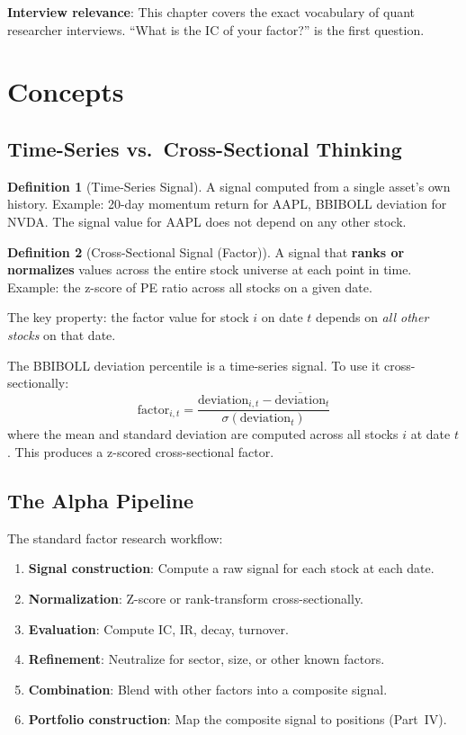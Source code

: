 \documentclass[a4paper, 11pt]{report}
\theoremstyle{definition}
\newtheorem{definition}{Definition}[chapter]
\theoremstyle{remark}
\begin{document}
\textbf{Interview relevance}: This chapter covers the exact vocabulary of quant
researcher interviews.  ``What is the IC of your factor?'' is the first question.

\section{Concepts}

\subsection{Time-Series vs.\ Cross-Sectional Thinking}

\begin{definition}[Time-Series Signal]
    A signal computed from a single asset's own history.  Example: 20-day
    momentum return for AAPL, BBIBOLL deviation for NVDA\@.  The signal value
    for AAPL does not depend on any other stock.
\end{definition}

\begin{definition}[Cross-Sectional Signal (Factor)]
    A signal that \textbf{ranks or normalizes} values across the entire stock
    universe at each point in time.  Example: the z-score of PE ratio across
    all stocks on a given date.

    The key property: the factor value for stock $i$ on date $t$ depends on
    \emph{all other stocks} on that date.
\end{definition}

The BBIBOLL deviation percentile is a time-series signal.  To use it
cross-sectionally:
\[
    \text{factor}_{i,t} = \frac{\text{deviation}_{i,t} - \overline{\text{deviation}}_t}
                               {\sigma(\text{deviation}_t)}
\]
where the mean and standard deviation are computed across all stocks $i$ at
date $t$.  This produces a z-scored cross-sectional factor.

\subsection{The Alpha Pipeline}

The standard factor research workflow:

\begin{enumerate}
    \item \textbf{Signal construction}: Compute a raw signal for each stock at
          each date.
    \item \textbf{Normalization}: Z-score or rank-transform cross-sectionally.
    \item \textbf{Evaluation}: Compute IC, IR, decay, turnover.
    \item \textbf{Refinement}: Neutralize for sector, size, or other known
          factors.
    \item \textbf{Combination}: Blend with other factors into a composite
          signal.
    \item \textbf{Portfolio construction}: Map the composite signal to
          positions (Part~IV).
\end{enumerate}
\end{document}
